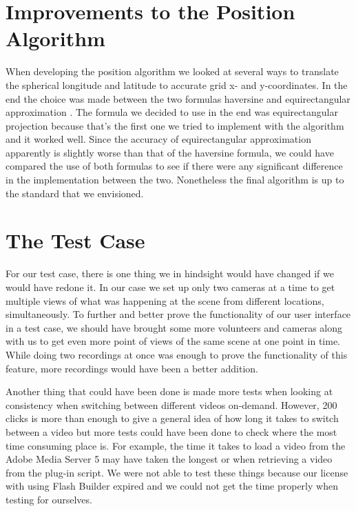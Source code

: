 \section{Improvements to the Position Algorithm}
\label{sec:posimp}

When developing the position algorithm we looked at several ways to translate the spherical longitude and latitude to accurate grid x- and y-coordinates. In the end the choice was made between the two formulas haversine and equirectangular approximation \cite{haversine,equi}. The formula we decided to use in the end was equirectangular projection because that’s the first one we tried to implement with the algorithm and it worked well. Since the accuracy of equirectangular approximation apparently is slightly worse than that of the haversine formula, we could have compared the use of both formulas to see if there were any significant difference in the implementation between the two. Nonetheless the final algorithm is up to the standard that we envisioned. 

\section{The Test Case}
\label{sec:test case} 
For our test case, there is one thing we in hindsight would have changed if we would have redone it. In our case we set up only two cameras at a time to get multiple views of what was happening at the scene from different locations, simultaneously. To further and better prove the functionality of our user interface in a test case, we should have brought some more volunteers and cameras along with us to get even more point of views of the same scene at one point in time. While doing two recordings at once was enough to prove the functionality of this feature, more recordings would have been a better addition. 

Another thing that could have been done is made more tests when looking at consistency when switching between different videos on-demand. However, 200 clicks is more than enough to give a general idea of how long it takes to switch between a video but more tests could have been done to check where the most time consuming place is. For example, the time it takes to load a video from the Adobe Media Server 5 may have taken the longest or when retrieving a video from the plug-in script. We were not able to test these things because our license with using Flash Builder expired and we could not get the time properly when testing for ourselves.

